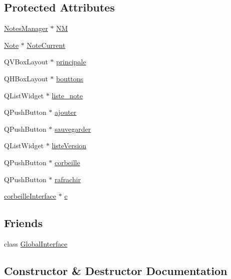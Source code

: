 \subsection*{Protected Attributes}
\begin{DoxyCompactItemize}
\item 
\hyperlink{classNotesManager}{Notes\+Manager} $\ast$ \hyperlink{classManagerInterface_ab184783ad4035e925d1dc25c08818f16}{NM}
\item 
\hyperlink{classNote}{Note} $\ast$ \hyperlink{classManagerInterface_a1a5b770475dee3de352235687328deb3}{Note\+Current}
\item 
Q\+V\+Box\+Layout $\ast$ \hyperlink{classManagerInterface_adba33225f9462c38847dedf81c315809}{principale}
\item 
Q\+H\+Box\+Layout $\ast$ \hyperlink{classManagerInterface_a6e71be780b780491e8d1b4c92cc723de}{bouttons}
\item 
Q\+List\+Widget $\ast$ \hyperlink{classManagerInterface_a8b004150ab9fddb63a62f83d61049e4f}{liste\+\_\+note}
\item 
Q\+Push\+Button $\ast$ \hyperlink{classManagerInterface_acb86b5ac8cc86654f4104ea89cbdc6fe}{ajouter}
\item 
Q\+Push\+Button $\ast$ \hyperlink{classManagerInterface_a2eb2db5955adc9f99eaf085d9d69e6b1}{sauvegarder}
\item 
Q\+List\+Widget $\ast$ \hyperlink{classManagerInterface_a079b3c462214e3660ccc6e4ae2eae795}{liste\+Version}
\item 
Q\+Push\+Button $\ast$ \hyperlink{classManagerInterface_aa8799be823bb80a138b35e81a13d5e5f}{corbeille}
\item 
Q\+Push\+Button $\ast$ \hyperlink{classManagerInterface_a491c96cf723b10d066fe6571722cc868}{rafrachir}
\item 
\hyperlink{classcorbeilleInterface}{corbeille\+Interface} $\ast$ \hyperlink{classManagerInterface_a64c4498d646d987fa4db08bc7cdf251c}{c}
\end{DoxyCompactItemize}
\subsection*{Friends}
\begin{DoxyCompactItemize}
\item 
class \hyperlink{classManagerInterface_a2250a78aa5cceb79c3e34da3f1fe0fde}{Global\+Interface}
\end{DoxyCompactItemize}


\subsection{Constructor \& Destructor Documentation}
